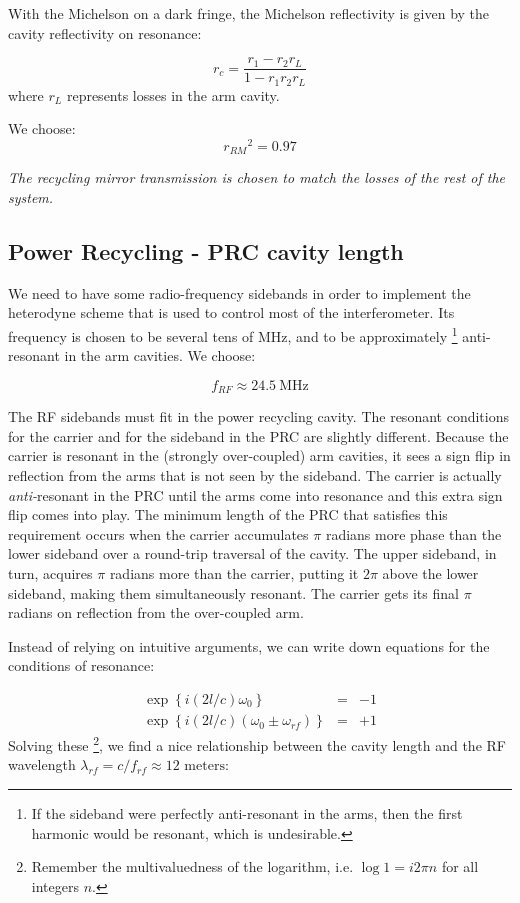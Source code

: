 With the Michelson on a dark fringe, the Michelson reflectivity is
given by the cavity reflectivity on resonance:

\begin{equation}
r_{c}=\frac{r_{1}-r_{2}r_L}{1-r_{1}r_{2}r_L}
\end{equation}
where $r_L$ represents losses in the arm cavity.

We choose:
\begin{equation}
r_{RM}{}^{2}=0.97
\end{equation}

\emph{The recycling mirror transmission is chosen to match the losses
of the rest of the system.}

\subsection*{Power Recycling - PRC cavity length}

We need to have some radio-frequency sidebands in order to implement
the heterodyne scheme that is used to control most of the interferometer.
Its frequency is chosen to be several tens of MHz, and to be approximately%
\footnote{If the sideband were perfectly anti-resonant in the arms, then the
first harmonic would be resonant, which is undesirable.%
} anti-resonant in the arm cavities. We choose:

\[
f_{RF}\approx24.5\mathrm{{\ MHz}}
\]

The RF sidebands must fit in the power recycling cavity. The resonant
conditions for the carrier and for the sideband in the PRC are slightly
different. Because the carrier is resonant in the (strongly over-coupled)
arm cavities, it sees a sign flip in reflection from the arms that
is not seen by the sideband. The carrier is actually \emph{anti-}resonant
in the PRC until the arms come into resonance and this extra sign
flip comes into play. The minimum length of the PRC that satisfies
this requirement occurs when the carrier accumulates $\pi$ radians
more phase than the lower sideband over a round-trip traversal of
the cavity. The upper sideband, in turn, acquires $\pi$ radians
more than the carrier, putting it $2\pi$ above the lower sideband,
making them simultaneously resonant. The carrier gets its final $\pi$
radians on reflection from the over-coupled arm.

Instead of relying
on intuitive arguments, we can write down equations for the conditions
of resonance:

\begin{eqnarray}
\exp \left\{i (2l/c)\omega_{0}  \right\} &=& -1 \\
\exp \left\{i (2l/c)(\omega_{0} \pm \omega_{rf}) \right\} &=& +1
\end{eqnarray}Solving these%
\footnote{Remember the multivaluedness of the logarithm, i.e. $\log1=i2\pi n$
for all integers $n$.%
}, we find a nice relationship between the cavity length and the RF
wavelength $\lambda_{rf}=c/f_{rf}\approx12\text{ meters}$:

